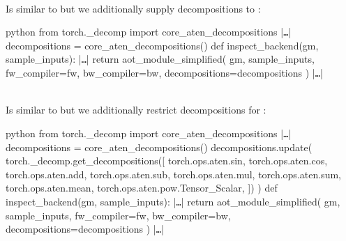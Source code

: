 \begin{examplebox}\nospacing
    \begin{example}\label{example:decomposing_aten_into_atencore}\leavevmode\\
    Is similar to  but we additionally supply decompositions to :
    \begin{plaincodebox}{python}
        from torch._decomp import core_aten_decompositions
        |\texttt{\ldots}|
        decompositions = core_aten_decompositions()
        def inspect_backend(gm, sample_inputs):
            |\texttt{\ldots}|
            return aot_module_simplified(
                gm,
                sample_inputs,
                fw_compiler=fw,
                bw_compiler=bw,
                decompositions=decompositions
            )
            |\texttt{\ldots}|
    \end{plaincodebox}
    \end{example}
\end{examplebox}
\begin{examplebox}\nospacing
    \begin{example}\label{example:decomposing_aten_core_into_prims}\leavevmode\\
    Is similar to  but we additionally restrict decompositions for :
    \begin{plaincodebox}{python}
        from torch._decomp import core_aten_decompositions
        |\texttt{\ldots}|
        decompositions = core_aten_decompositions()
        decompositions.update(
            torch._decomp.get_decompositions([
                torch.ops.aten.sin,
                torch.ops.aten.cos,
                torch.ops.aten.add,
                torch.ops.aten.sub,
                torch.ops.aten.mul,
                torch.ops.aten.sum,
                torch.ops.aten.mean,
                torch.ops.aten.pow.Tensor_Scalar,
            ])
        )
        def inspect_backend(gm, sample_inputs):
            |\texttt{\ldots}|
            return aot_module_simplified(
                gm,
                sample_inputs,
                fw_compiler=fw,
                bw_compiler=bw,
                decompositions=decompositions
            )
            |\texttt{\ldots}|
    \end{plaincodebox}
    \end{example}
\end{examplebox}

